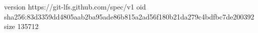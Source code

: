 version https://git-lfs.github.com/spec/v1
oid sha256:83d3359dd4805aab2ba95ade86b815a2ad56f180b21da279c4bdfbc7de200392
size 135712
